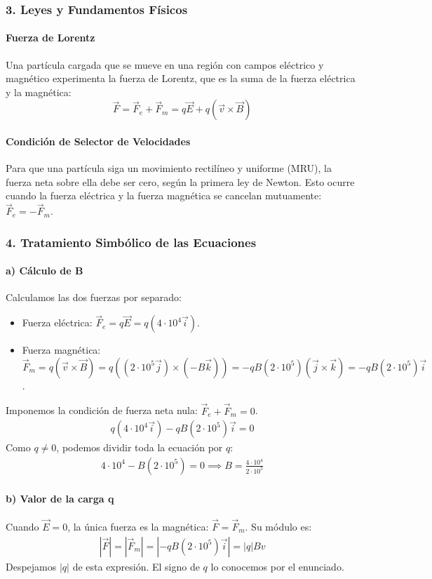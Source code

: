 \subsubsection*{3. Leyes y Fundamentos Físicos}
\paragraph*{Fuerza de Lorentz}
Una partícula cargada que se mueve en una región con campos eléctrico y magnético experimenta la fuerza de Lorentz, que es la suma de la fuerza eléctrica y la magnética:
$$ \vec{F} = \vec{F}_e + \vec{F}_m = q\vec{E} + q(\vec{v} \times \vec{B}) $$
\paragraph*{Condición de Selector de Velocidades}
Para que una partícula siga un movimiento rectilíneo y uniforme (MRU), la fuerza neta sobre ella debe ser cero, según la primera ley de Newton. Esto ocurre cuando la fuerza eléctrica y la fuerza magnética se cancelan mutuamente: $\vec{F}_e = -\vec{F}_m$.

\subsubsection*{4. Tratamiento Simbólico de las Ecuaciones}
\paragraph*{a) Cálculo de B}
Calculamos las dos fuerzas por separado:
\begin{itemize}
    \item Fuerza eléctrica: $\vec{F}_e = q\vec{E} = q(4 \cdot 10^4 \vec{i})$.
    \item Fuerza magnética: $\vec{F}_m = q(\vec{v} \times \vec{B}) = q((2 \cdot 10^5 \vec{j}) \times (-B\vec{k})) = -qB(2 \cdot 10^5)(\vec{j} \times \vec{k}) = -qB(2 \cdot 10^5)\vec{i}$.
\end{itemize}
Imponemos la condición de fuerza neta nula: $\vec{F}_e + \vec{F}_m = 0$.
\begin{gather}
    q(4 \cdot 10^4 \vec{i}) - qB(2 \cdot 10^5)\vec{i} = 0
\end{gather}
Como $q \neq 0$, podemos dividir toda la ecuación por $q$:
\begin{gather}
    4 \cdot 10^4 - B(2 \cdot 10^5) = 0 \implies B = \frac{4 \cdot 10^4}{2 \cdot 10^5}
\end{gather}
\paragraph*{b) Valor de la carga q}
Cuando $\vec{E}=0$, la única fuerza es la magnética: $\vec{F} = \vec{F}_m$. Su módulo es:
\begin{gather}
    |\vec{F}| = |\vec{F}_m| = |-qB(2\cdot10^5)\vec{i}| = |q| B v
\end{gather}
Despejamos $|q|$ de esta expresión. El signo de $q$ lo conocemos por el enunciado.

